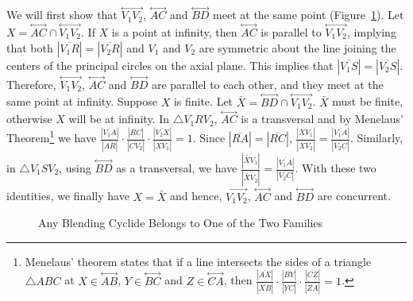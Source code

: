 We will first show that 
$\stackrel{\longleftrightarrow}{V_1V_2}$,
$\stackrel{\longleftrightarrow}{AC}$ and
$\stackrel{\longleftrightarrow}{BD}$ meet at the same point
(Figure~\ref{fig:concurrent}).  
Let $X=\stackrel{\longleftrightarrow}{AC}\cap
\stackrel{\longleftrightarrow}{V_1V_2}$.  If $X$ is a point at infinity, then
$\stackrel{\longleftrightarrow}{AC}$ is parallel to
$\stackrel{\longleftrightarrow}{V_1V_2}$, implying that both
$|\overline{V_1R}|=|\overline{V_2R}|$ and $V_1$ and $V_2$ are symmetric about 
the line joining the centers of the principal circles on the axial plane.  
This implies that $|\overline{V_1S}|=|\overline{V_2S}|$.  Therefore, 
$\stackrel{\longleftrightarrow}{V_1V_2}$,
$\stackrel{\longleftrightarrow}{AC}$ and
$\stackrel{\longleftrightarrow}{BD}$ are parallel to each other, and
they meet at the same point at infinity.
Suppose $X$ is finite.  Let $\bar{X}=\stackrel{\longleftrightarrow}{BD}\cap
\stackrel{\longleftrightarrow}{V_1V_2}$.  $\bar{X}$ must be finite, otherwise
$X$ will be at infinity.  In $\bigtriangleup V_1RV_2$,
$\stackrel{\longleftrightarrow}{AC}$ is a transversal and by Menelaus' 
Theorem\footnote{Menelaus' theorem \cite{johnson:1929} states that 
	if a line intersects the sides of a triangle 
	$\bigtriangleup ABC$ at $X\in\stackrel{\longleftrightarrow}{AB}$,
	$Y\in\stackrel{\longleftrightarrow}{BC}$ and
	$Z\in\stackrel{\longleftrightarrow}{CA}$,
	then $\frac{|\overline{AX}|}{|\overline{XB}|}\cdot
	     \frac{|\overline{BY}|}{|\overline{YC}|}\cdot
	     \frac{|\overline{CZ}|}{|\overline{ZA}|} = 1$.}
we have 
$\frac{|\overline{V_1A}|}{|\overline{AR}|}\cdot
   \frac{|\overline{RC}|}{|\overline{CV_2}|}\cdot
   \frac{|\overline{V_2X}|}{|\overline{XV_1}|} = 1$.
Since $|\overline{RA}|=|\overline{RC}|$,
$\frac{|\overline{XV_1}|}{|\overline{XV_2}|} =
   \frac{|\overline{V_1A}|}{|\overline{V_2C}|}$.
Similarly, in $\bigtriangleup V_1SV_2$, using 
$\stackrel{\longleftrightarrow}{BD}$ as a transversal, we have
$\frac{|\overline{\bar{X}V_1}|}{|\overline{\bar{X}V_2}|} =
   \frac{|\overline{V_1A}|}{|\overline{V_2C}|}$.
With these two identities, we finally have $X=\bar{X}$ and hence,
$\stackrel{\longleftrightarrow}{V_1V_2}$,
$\stackrel{\longleftrightarrow}{AC}$ and
$\stackrel{\longleftrightarrow}{BD}$ are concurrent.

\begin{figure}
\vspace{11cm}
\caption{Any Blending Cyclide Belongs to One of the Two Families}
\label{fig:concurrent}
\end{figure}

